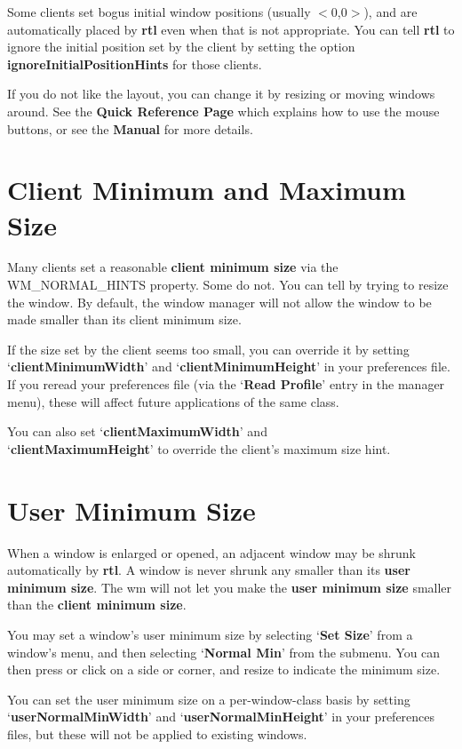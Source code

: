 Some clients set bogus initial window positions (usually
$<$0,0$>$), and are 
automatically placed by {\bf rtl} even when that is not appropriate.
You can tell {\bf rtl} to ignore the initial position set by the
client by setting the option {\bf ignoreInitialPositionHints} for those
clients.

If you do not like the layout, you can change it by resizing or moving
windows around.  See the {\bf Quick Reference Page} which explains how to
use the mouse buttons, or see the {\bf Manual} for more details.

\section{Client Minimum and Maximum Size}

Many clients set a reasonable {\bf client minimum size} via
the \\
{\sc WM\_NORMAL\_HINTS} property.  Some do not.
You can tell by trying to resize the window.
By default, the window manager will not allow the window to be
made smaller than its client minimum size.

If the size set by the client seems too small, you can
override it by setting `{\bf clientMinimumWidth}' and
`{\bf clientMinimumHeight}' in your preferences file.
If you reread your preferences file (via the `{\bf Read Profile}' entry
in the manager menu), these will affect future applications
of the same class.

You can also set `{\bf clientMaximumWidth}' and \\ 
`{\bf clientMaximumHeight}'
to override the client's maximum size hint.

\section{User Minimum Size}

When a window is enlarged or opened, an adjacent window may be
shrunk automatically by {\bf rtl}.  A window is never shrunk
any smaller than its {\bf user minimum size}.
The wm will not let you make the {\bf user minimum size} smaller
than the {\bf client minimum size}.

You may set a window's user minimum size by selecting
`{\bf Set Size}' from a window's menu, and then selecting
`{\bf Normal Min}' from the submenu.  You can then press or click
on a side or corner, and resize to indicate the minimum size.

You can set the user minimum size on a per-window-class basis
by setting `{\bf userNormalMinWidth}' and `{\bf userNormalMinHeight}'
in your preferences files, but these will not be applied to
existing windows.

